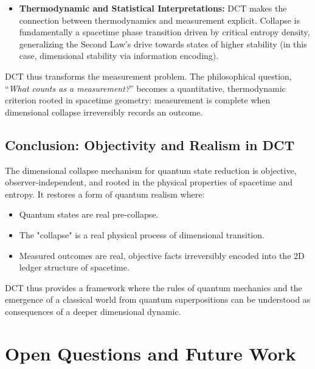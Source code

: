 \documentclass[a4paper, 12pt, oneside]{book}
\numberwithin{equation}{chapter}
\begin{document}
\begin{itemize}
    \item \textbf{Thermodynamic and Statistical Interpretations:}
        DCT makes the connection between thermodynamics and measurement explicit. Collapse is fundamentally a spacetime phase transition driven by critical entropy density, generalizing the Second Law's drive towards states of higher stability (in this case, dimensional stability via information encoding).
\end{itemize}
DCT thus transforms the measurement problem. The philosophical question, ``\emph{What counts as a measurement?}'' becomes a quantitative, thermodynamic criterion rooted in spacetime geometry: measurement is complete when dimensional collapse irreversibly records an outcome.

\subsection[Objectivity and Realism]{Conclusion: Objectivity and Realism in DCT}
\label{ssec:MeasurementObjectivityDCT}

The dimensional collapse mechanism for quantum state reduction is objective, observer-independent, and rooted in the physical properties of spacetime and entropy. It restores a form of quantum realism where:
\begin{itemize}
    \item Quantum states are real pre-collapse.
    \item The "collapse" is a real physical process of dimensional transition.
    \item Measured outcomes are real, objective facts irreversibly encoded into the 2D ledger structure of spacetime.
\end{itemize}
DCT thus provides a framework where the rules of quantum mechanics and the emergence of a classical world from quantum superpositions can be understood as consequences of a deeper dimensional dynamic.

\section{Open Questions and Future Work}
\label{sec:OpenQuestions}
\end{document}
